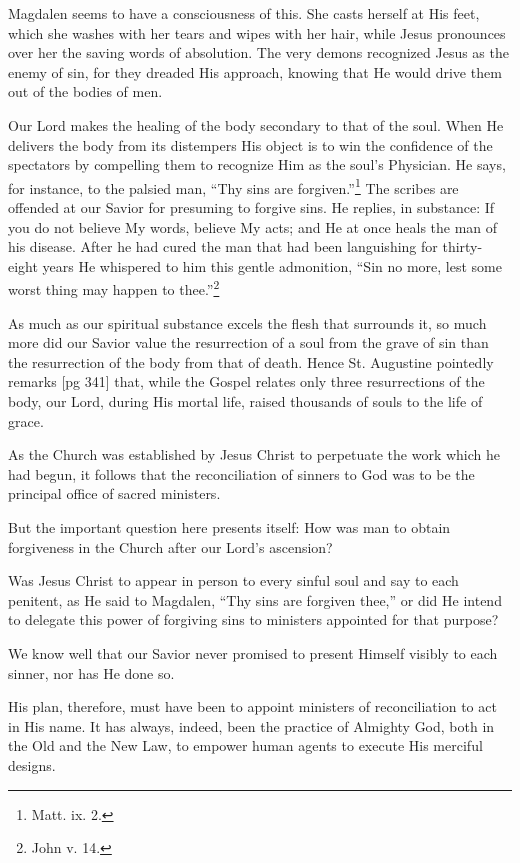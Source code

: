 Magdalen seems to have a consciousness of this.
She casts herself at His feet, which she washes
with her tears and wipes with her hair, while
Jesus pronounces over her the saving words of
absolution. The very demons recognized Jesus
as the enemy of sin, for they dreaded His approach,
knowing that He would drive them out of
the bodies of men.

Our Lord makes the healing of the body secondary
to that of the soul. When He delivers the
body from its distempers His object is to win the
confidence of the spectators by compelling them
to recognize Him as the soul's Physician. He
says, for instance, to the palsied man, “Thy sins
are forgiven.”\footnote{Matt. ix.
2.} The scribes are offended at our
Savior for presuming to forgive sins. He replies,
in substance: If you do not believe My words, believe
My acts; and He at once heals the man of
his disease. After he had cured the man that had
been languishing for thirty-eight years He whispered
to him this gentle admonition, “Sin no more,
lest some worst thing may happen to thee.”\footnote{John
v. 14.}

As much as our spiritual substance excels the
flesh that surrounds it, so much more did our
Savior value the resurrection of a soul from the
grave of sin than the resurrection of the body from
that of death. Hence St. Augustine pointedly remarks
[pg 341]
that, while the Gospel relates only three
resurrections of the body, our Lord, during His
mortal life, raised thousands of souls to the life
of grace.

As the Church was established by Jesus Christ
to perpetuate the work which he had begun, it follows
that the reconciliation of sinners to God was
to be the principal office of sacred ministers.

But the important question here presents itself:
How was man to obtain forgiveness in the Church
after our Lord's ascension?

Was Jesus Christ to appear in person to every
sinful soul and say to each penitent, as He said to
Magdalen, “Thy sins are forgiven thee,” or did
He intend to delegate this power of forgiving sins
to ministers appointed for that purpose?

We know well that our Savior never promised
to present Himself visibly to each sinner, nor has
He done so.

His plan, therefore, must have been to appoint
ministers of reconciliation to act in His name. It
has always, indeed, been the practice of Almighty
God, both in the Old and the New Law, to empower
human agents to execute His merciful designs.

